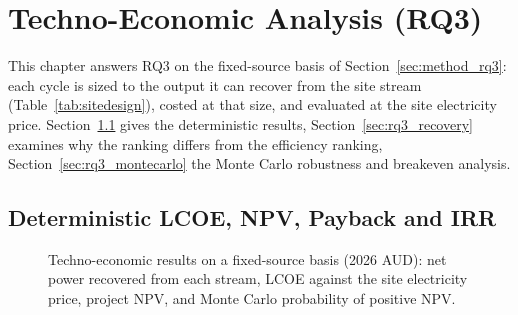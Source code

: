 \chapter{Techno-Economic Analysis (RQ3)}
\label{ch:results_rq3}

This chapter answers RQ3 on the fixed-source basis of
Section~\ref{sec:method_rq3}: each cycle is sized to the output it can
recover from the site stream (Table~\ref{tab:sitedesign}), costed at that
size, and evaluated at the site electricity price.
Section~\ref{sec:rq3_deterministic} gives the deterministic results,
Section~\ref{sec:rq3_recovery} examines why the ranking differs from the
efficiency ranking, Section~\ref{sec:rq3_montecarlo} the Monte Carlo
robustness and breakeven analysis.

\section{Deterministic LCOE, NPV, Payback and IRR}
\label{sec:rq3_deterministic}

\begin{figure}[H]
\centering
{}
\caption{Techno-economic results on a fixed-source basis (2026 AUD): net
power recovered from each stream, LCOE against the site electricity price,
project NPV, and Monte Carlo probability of positive NPV.}
\label{fig:rq3_results}
\end{figure}

